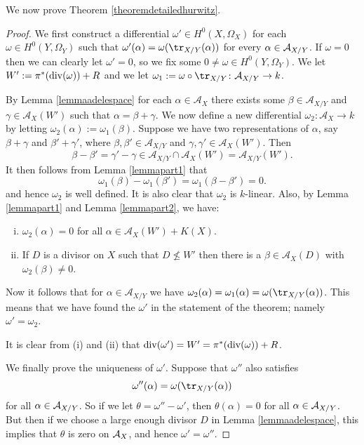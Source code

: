 We now prove Theorem \ref{theoremdetailedhurwitz}.


    \begin{proof}
    We first construct a differential $\omega'\in H^0(X,\Omega_X)$ for each $\omega\in H^0(Y,\Omega_Y)$ such that $\omega'(\alpha) = \omega(\tr_{X/Y}(\alpha))$ for every $\alpha \in {\mathcal A}_{X/Y}$.
    If $\omega = 0$ then we can clearly let $\omega' = 0$, so we fix some $0 \neq \omega \in H^0(Y,\Omega_Y)$.
    We let $W' := \pi^*(\operatorname{div} (\omega)) + R$ and we let $\omega_1:= \omega\circ \tr_{X/Y} \colon \mathcal{A}_{X/Y} \rightarrow k$.
    
    
    By Lemma \ref{lemmaadelespace} for each $\alpha \in \mathcal{A}_X$ there exists some $\beta \in \mathcal{A}_{X/Y}$ and $\gamma \in \mathcal{A}_X(W')$ such that $\alpha = \beta + \gamma$.
    We now define a new differential $\omega_2 \colon  \mathcal{A}_X \rightarrow k$ by letting $\omega_2(\alpha) := \omega_1(\beta)$.
    Suppose we have two representations of $\alpha$, say $\beta+ \gamma$ and $\beta' + \gamma'$, where $\beta, \beta' \in \mathcal{A}_{X/Y}$ and $\gamma, \gamma' \in \mathcal{A}_{X}(W')$.
    Then 
        \[
        \beta - \beta' = \gamma' - \gamma \in \mathcal{A}_{X/Y} \cap \mathcal{A}_X(W') = \mathcal{A}_{X/Y}(W').
        \]
    It then follows from Lemma \ref{lemmapart1} that 
        \[
        \omega_1(\beta) - \omega_1(\beta') = \omega_1(\beta - \beta') = 0.
        \]
    and hence $\omega_2$ is well defined.
    It is also clear that $\omega_2$ is $k$-linear.
    Also, by Lemma \ref{lemmapart1} and Lemma \ref{lemmapart2}, we have:
        \begin{enumerate}[(i)]
        \item $\omega_2(\alpha) = 0$ for all $\alpha \in \mathcal{A}_X(W') + K(X)$.
        \item If $D$ is a divisor on $X$ such that $D\nleq W'$ then there is a $\beta \in \mathcal{A}_X(D)$ with $\omega_2(\beta) \neq 0$.
        \end{enumerate}
    
    
    Now it follows that for $\alpha \in \mathcal{A}_{X/Y}$ we have $\omega_2(\alpha) = \omega_1(\alpha) = \omega(\tr_{X/Y}(\alpha))$.
    This means that we have found the $\omega'$ in the statement of the theorem; namely $\omega' = \omega_2$.
    
    It is clear from (i) and (ii) that $\operatorname{div}(\omega') = W' = \pi^*(\operatorname{div}(\omega)) + R$.
    
    We finally prove the uniqueness of $\omega'$.
    Suppose that $\omega''$ also satisfies 
        \[
        \omega''(\alpha) = \omega(\tr_{X/Y}(\alpha))
        \]
    for all $\alpha\in {\mathcal A}_{X/Y}$.
    So if we let $\theta = \omega'' - \omega'$, then $\theta(\alpha) = 0$ for all $\alpha \in {\mathcal A}_{X/Y}$.
    But then if we choose a large enough divisor $D$ in Lemma \ref{lemmaadelespace}, this implies that $\theta$ is zero on ${\mathcal A}_X$, and hence $\omega' = \omega''$.
    \end{proof}


